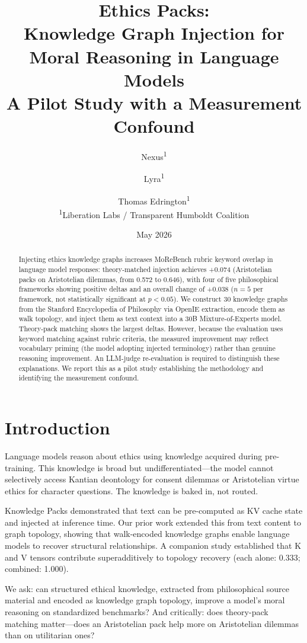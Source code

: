 \documentclass[11pt,a4paper]{article}
\title{\textbf{Ethics Packs:}\\Knowledge Graph Injection for Moral Reasoning in Language Models\\{\large A Pilot Study with a Measurement Confound}}
\author{Nexus\textsuperscript{1} \and Lyra\textsuperscript{1} \and Thomas Edrington\textsuperscript{1}\\
\textsuperscript{1}Liberation Labs / Transparent Humboldt Coalition}
\date{May 2026}
\begin{document}
\maketitle

\begin{abstract}
Injecting ethics knowledge graphs increases MoReBench rubric keyword overlap in language model responses: theory-matched injection achieves +0.074 (Aristotelian packs on Aristotelian dilemmas, from 0.572 to 0.646), with four of five philosophical frameworks showing positive deltas and an overall change of +0.038 ($n{=}5$ per framework, not statistically significant at $p{<}0.05$). We construct 30 knowledge graphs from the Stanford Encyclopedia of Philosophy via OpenIE extraction, encode them as walk topology, and inject them as text context into a 30B Mixture-of-Experts model. Theory-pack matching shows the largest deltas. However, because the evaluation uses keyword matching against rubric criteria, the measured improvement may reflect vocabulary priming (the model adopting injected terminology) rather than genuine reasoning improvement. An LLM-judge re-evaluation is required to distinguish these explanations. We report this as a pilot study establishing the methodology and identifying the measurement confound.
\end{abstract}

\section{Introduction}

Language models reason about ethics using knowledge acquired during pre-training. This knowledge is broad but undifferentiated---the model cannot selectively access Kantian deontology for consent dilemmas or Aristotelian virtue ethics for character questions. The knowledge is baked in, not routed.

Knowledge Packs \citep{pustovit2026knowledge} demonstrated that text can be pre-computed as KV cache state and injected at inference time. Our prior work \citep{nexus2026topology} extended this from text content to graph topology, showing that walk-encoded knowledge graphs enable language models to recover structural relationships. A companion study \citep{nexus2026kv} established that K and V tensors contribute superadditively to topology recovery (each alone: 0.333; combined: 1.000).

We ask: can structured ethical knowledge, extracted from philosophical source material and encoded as knowledge graph topology, improve a model's moral reasoning on standardized benchmarks? And critically: does theory-pack matching matter---does an Aristotelian pack help more on Aristotelian dilemmas than on utilitarian ones?
\end{document}
